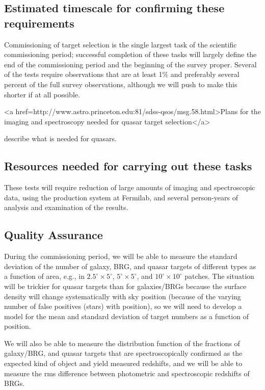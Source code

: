 \subsection{Estimated timescale for confirming these requirements}

Commissioning of target selection is the single largest task of the
scientific commissioning period; 
successful completion of these tasks will largely define
the end of the commissioning period and the beginning of the 
survey proper.  Several of the tests require observations that are
at least 1\% and preferably several percent of the full survey
observations, although we will push to make this shorter if at all
possible.   
\begin{rawhtml}
<a href=http://www.astro.princeton.edu:81/sdss-qsos/msg.58.html>Plans for the imaging and spectroscopy needed for quasar
target selection</a>\end{rawhtml} describe
what is needed for quasars. 

\subsection{Resources needed for carrying out these tasks}

These tests will require reduction of large amounts of imaging
and spectroscopic data, using the production system at Fermilab,
and several person-years of analysis and examination of the results.

\subsection{Quality Assurance}

During the commissioning period, we will be able to measure the
standard deviation of the number of galaxy, BRG, and quasar
targets of different types as a function of area, e.g., in
$2.5^\circ \times 5^\circ$, $5^\circ \times 5^\circ$, and
$10^\circ \times 10^\circ$ patches.
The situation will be trickier for quasar targets than for galaxies/BRGs
because the surface density will change systematically with sky
position (because of the varying number of false positives (stars)
with position), so we will need to develop a model for the mean and 
standard deviation of target numbers as a function of position.

We will also be able to measure the distribution function of the
fractions of galaxy/BRG, and quasar targets that are spectroscopically
confirmed as the expected kind of object and yield measured redshifts,
and we will be able to measure the rms difference between photometric
and spectroscopic redshifts of BRGs.

